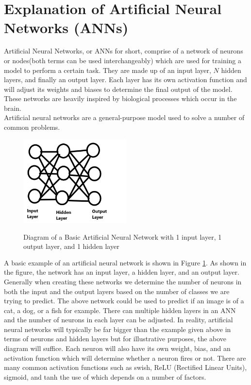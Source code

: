 \section{Explanation of Artificial Neural Networks (ANNs)}
Artificial Neural Networks, or ANNs for short, comprise of a network of neurons or nodes(both terms can be used interchangeably) which are used for training a model to perform a certain task.  They are made up of an input layer, $N$ hidden layers, and finally an output layer.  Each layer has its own activation function and will adjust its weights and biases to determine the final output of the model.\cite{introToCnn} These networks are  heavily inspired by biological processes which occur in the brain.
\\
Artificial neural networks are a general-purpose model used to solve a number of common problems.
\vspace{0.5mm}
\begin{figure}[H]
    \centering
    \includegraphics[width=0.5\textwidth]{Images/ANN Basic.jpg}\\
    \caption{Diagram of a Basic Artificial Neural Network with 1 input layer, 1 output layer, and 1 hidden layer}
    \label{fig:Example ANN Diagram}
\end{figure}
\vspace{0.5mm}

A basic example of an artificial neural network is shown in Figure \ref{fig:Example ANN Diagram}. As shown in the figure, the network has an input layer, a hidden layer, and an output layer.  Generally when creating these networks we determine the number of neurons in both the input and the output layers based on the number of classes we are trying to predict.  The above network could be used to predict if an image is of a cat, a dog, or a fish for example.  There can multiple hidden layers in an ANN and the number of neurons in each layer can be adjusted.  In reality, artificial neural networks will typically be far bigger than the example given above in terms of neurons and hidden layers but for illustrative purposes, the above diagram will suffice.  Each neuron will also have its own weight, bias, and an activation function which will determine whether a neuron fires or not. There are many common activation functions such as swish, ReLU (Rectified Linear Units), sigmoid, and tanh the use of which depends on a number of factors.
